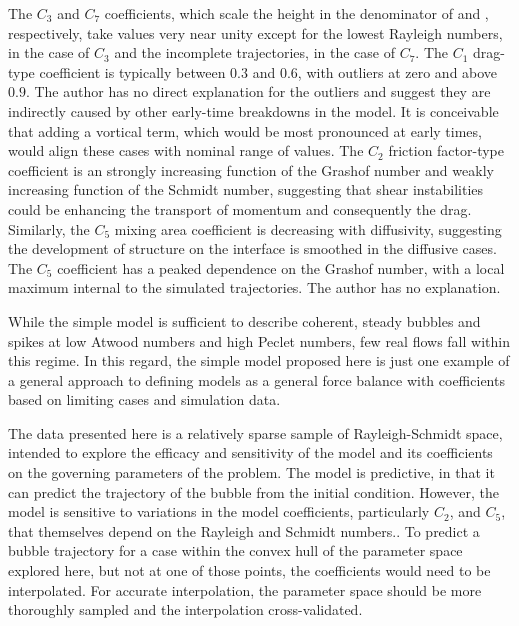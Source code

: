 The $C_3$ and $C_7$ coefficients, which scale the height in the denominator of  and , respectively, take values very near unity except for the lowest Rayleigh numbers, in the case of $C_3$ and the incomplete trajectories, in the case of $C_7$.
The $C_1$ drag-type coefficient is typically between $0.3$ and $0.6$, with outliers at zero and above $0.9$.
The author has no direct explanation for the outliers and suggest they are indirectly caused by other early-time breakdowns in the model.
It is conceivable that adding a vortical term, which would be most pronounced at early times, would align these cases with nominal range of values.
The $C_2$ friction factor-type coefficient is an strongly increasing function of the Grashof number and weakly increasing function of the Schmidt number, suggesting that shear instabilities could be enhancing the transport of momentum and consequently the drag.
Similarly, the $C_5$ mixing area coefficient is decreasing with diffusivity, suggesting the development of structure on the interface is smoothed in the diffusive cases.
The $C_5$ coefficient has a peaked dependence on the Grashof number, with a local maximum internal to the simulated trajectories.
The author has no explanation.

While the simple model is sufficient to describe coherent, steady bubbles and spikes at low Atwood numbers and high Peclet numbers, few real flows fall within this regime.
In this regard, the simple model proposed here is just one example of a general approach to defining models as a general force balance with coefficients based on limiting cases and simulation data.

The data presented here is a relatively sparse sample of Rayleigh-Schmidt space, intended to explore the efficacy and sensitivity of the model and its coefficients on the governing parameters of the problem.
The model is predictive, in that it can predict the trajectory of the bubble from the initial condition.
However, the model is sensitive to variations in the model coefficients, particularly $C_2$, and $C_5$, that themselves depend on the Rayleigh and Schmidt numbers..
To predict a bubble trajectory for a case within the convex hull of the parameter space explored here, but not at one of those points, the coefficients would need to be interpolated.
For accurate interpolation, the parameter space should be more thoroughly sampled and the interpolation cross-validated.

